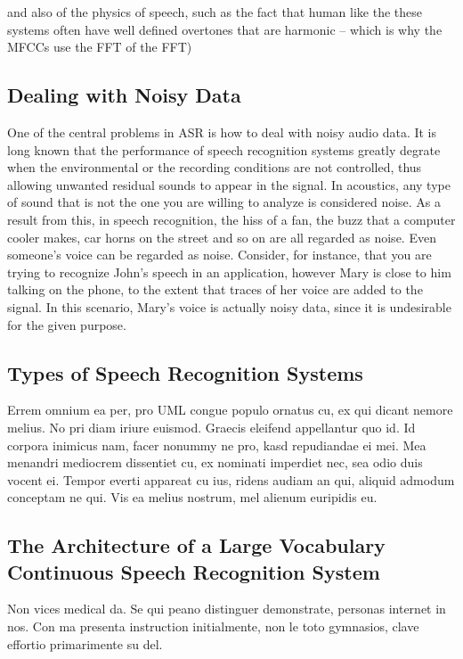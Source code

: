 and also of the physics of speech, such as the fact that human like the these systems often have well defined overtones that are harmonic -- which is why the MFCCs use the FFT of the FFT)


\subsection{Dealing with Noisy Data}

One of the central problems in \ac{ASR} is how to deal with noisy audio data. It is long known that the performance of 
speech recognition systems greatly degrate when the environmental or the recording conditions are not controlled, 
thus allowing unwanted residual sounds to appear in the signal. In acoustics, any type of sound that is not the one
you are willing to analyze is considered noise. As a result from this, in speech recognition, the hiss of a fan, 
the buzz that a computer cooler makes, car horns on the street and so on are all regarded as noise. Even someone's voice
can be regarded as noise. Consider, for instance, that you are trying to recognize John's speech in an application, 
however Mary is close to him talking on the phone, to the extent that traces of her voice are added to the signal. In this
scenario, Mary's voice is actually noisy data, since it is undesirable for the given purpose. 

\subsection{Types of Speech Recognition Systems} 
Errem omnium ea per, pro \ac{UML} congue populo ornatus cu, ex qui
dicant nemore melius. No pri diam iriure euismod. Graecis eleifend
appellantur quo id. Id corpora inimicus nam, facer nonummy ne pro,
kasd repudiandae ei mei. Mea menandri mediocrem dissentiet cu, ex
nominati imperdiet nec, sea odio duis vocent ei. Tempor everti
appareat cu ius, ridens audiam an qui, aliquid admodum conceptam ne
qui. Vis ea melius nostrum, mel alienum euripidis eu.

\subsection{The Architecture of a Large Vocabulary Continuous Speech Recognition System} 
Non vices medical da. Se qui peano distinguer demonstrate, personas
internet in nos. Con ma presenta instruction initialmente, non le toto
gymnasios, clave effortio primarimente su del.


